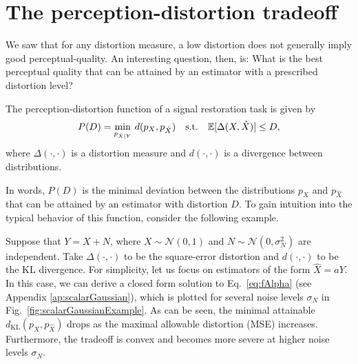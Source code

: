 \section{The perception-distortion tradeoff}\label{sec:tradeOff}
We saw that for any distortion measure, a low distortion does not generally imply good perceptual-quality. An interesting question, then, is: What is the best perceptual quality that can be attained by an estimator with a prescribed distortion level?
\begin{definition}
The perception-distortion function of a signal restoration task is given by
\begin{equation}\label{eq:fAlpha}
P(D) = \min_{p_{\hat{X} \vert Y}} \, d(p_X,p_{\hat{X}}) \quad \text{s.t.} \quad  \mathbb{E}[\Delta(X,\hat{X})] \le D,
\end{equation}
where $\Delta(\cdot,\cdot)$ is a distortion measure and $d(\cdot,\cdot)$ is a divergence between distributions.
\end{definition}
In words, $P(D)$ is the minimal deviation between the distributions $p_X$ and $p_{\hat{X}}$ that can be attained by an estimator with distortion $D$.
To gain intuition into the typical behavior of this function, consider the following example.
\begin{example}\label{ex:scalarGaussian}
Suppose that $Y=X+N$, where $X \sim \mathcal{N}(0,1)$ and $N \sim \mathcal{N}(0,\sigma_N^2)$ are independent. Take $\Delta(\cdot,\cdot)$ to be the square-error distortion and $d(\cdot,\cdot)$ to be the KL divergence. For simplicity, let us focus on estimators of the form $\hat{X}=aY$. In this case, we can derive a closed form solution to Eq.~\eqref{eq:fAlpha} (see Appendix \ref{ap:scalarGaussian}), which is plotted for several noise levels $\sigma_N$ in Fig.~\ref{fig:scalarGaussianExample}. As can be seen, the minimal attainable $d_{\text{KL}}(p_X,p_{\hat{X}})$ drops as the maximal allowable distortion (MSE) increases. Furthermore, the tradeoff is convex and becomes more severe at higher noise levels $\sigma_N$.
\end{example}

